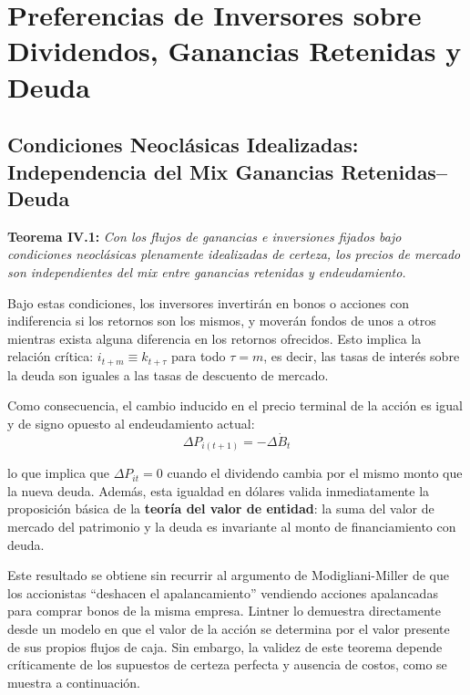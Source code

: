\documentclass[12pt]{article}
\begin{document}
\section{Preferencias de Inversores sobre Dividendos, Ganancias Retenidas y Deuda}

\subsection{Condiciones Neocl\'asicas Idealizadas: Independencia del Mix Ganancias Retenidas--Deuda}

\textbf{Teorema IV.1:} \textit{Con los flujos de ganancias e inversiones fijados bajo condiciones neocl\'asicas plenamente idealizadas de certeza, los precios de mercado son independientes del mix entre ganancias retenidas y endeudamiento.}

Bajo estas condiciones, los inversores invertir\'an en bonos o acciones con indiferencia si los retornos son los mismos, y mover\'an fondos de unos a otros mientras exista alguna diferencia en los retornos ofrecidos. Esto implica la relaci\'on cr\'itica: $i_{t+m} \equiv k_{t+\tau}$ para todo $\tau = m$, es decir, las tasas de inter\'es sobre la deuda son iguales a las tasas de descuento de mercado.

Como consecuencia, el cambio inducido en el precio terminal de la acci\'on es igual y de signo opuesto al endeudamiento actual:
\begin{equation}
\Delta P_{i(t+1)} = -\Delta \dot{B}_t
\end{equation}

lo que implica que $\Delta P_{it} = 0$ cuando el dividendo cambia por el mismo monto que la nueva deuda. Adem\'as, esta igualdad en d\'olares valida inmediatamente la proposici\'on b\'asica de la \textbf{teor\'ia del valor de entidad}: la suma del valor de mercado del patrimonio y la deuda es invariante al monto de financiamiento con deuda.

\begin{explicacion}
Este resultado se obtiene sin recurrir al argumento de Modigliani-Miller de que los accionistas ``deshacen el apalancamiento'' vendiendo acciones apalancadas para comprar bonos de la misma empresa. Lintner lo demuestra directamente desde un modelo en que el valor de la acci\'on se determina por el valor presente de sus propios flujos de caja. Sin embargo, la validez de este teorema depende cr\'iticamente de los supuestos de certeza perfecta y ausencia de costos, como se muestra a continuaci\'on.
\end{explicacion}
\end{document}
